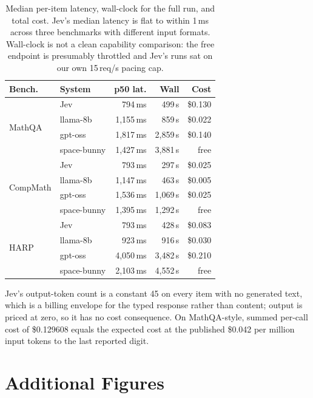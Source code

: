 \documentclass[11pt]{article}
\newcommand{\hic}[1]{\cellcolor{cellcyan}#1}
\begin{document}
\begin{table}[h]
\centering
\small
\setlength{\tabcolsep}{3.5pt}
\begin{tabular}{llrrr}
\toprule
\textbf{Bench.} & \textbf{System} & \textbf{p50 lat.} & \textbf{Wall} & \textbf{Cost} \\
\midrule
\multirow{4}{*}{MathQA}
 & Jev & \hic{794\,ms} & \hic{499\,s} & \$0.130 \\
 & llama-8b & 1{,}155\,ms & 859\,s & \$0.022 \\
 & gpt-oss & 1{,}817\,ms & 2{,}859\,s & \$0.140 \\
 & space-bunny & 1{,}427\,ms & 3{,}881\,s & free \\
\midrule
\multirow{4}{*}{CompMath}
 & Jev & \hic{793\,ms} & \hic{297\,s} & \$0.025 \\
 & llama-8b & 1{,}147\,ms & 463\,s & \$0.005 \\
 & gpt-oss & 1{,}536\,ms & 1{,}069\,s & \$0.025 \\
 & space-bunny & 1{,}395\,ms & 1{,}292\,s & free \\
\midrule
\multirow{4}{*}{HARP}
 & Jev & \hic{793\,ms} & \hic{428\,s} & \$0.083 \\
 & llama-8b & 923\,ms & 916\,s & \$0.030 \\
 & gpt-oss & 4{,}050\,ms & 3{,}482\,s & \$0.210 \\
 & space-bunny & 2{,}103\,ms & 4{,}552\,s & free \\
\bottomrule
\end{tabular}
\caption{Median per-item latency, wall-clock for the full run, and total cost. Jev's median latency is flat to within 1\,ms across three benchmarks with different input formats. Wall-clock is not a clean capability comparison: the free endpoint is presumably throttled and Jev's runs sat on our own 15\,req/s pacing cap.}
\end{table}

Jev's output-token count is a constant 45 on every item with no generated text, which is a billing envelope for the typed response rather than content; output is priced at zero, so it has no cost consequence. On MathQA-style, summed per-call cost of \$0.129608 equals the expected cost at the published \$0.042 per million input tokens to the last reported digit.

\section{Additional Figures}
\label{app:extra}
\end{document}
